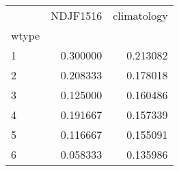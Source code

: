 \begin{tabular}{lrr}
\toprule
{} &  NDJF1516 &  climatology \\
wtype &           &              \\
\midrule
1     &  0.300000 &     0.213082 \\
2     &  0.208333 &     0.178018 \\
3     &  0.125000 &     0.160486 \\
4     &  0.191667 &     0.157339 \\
5     &  0.116667 &     0.155091 \\
6     &  0.058333 &     0.135986 \\
\bottomrule
\end{tabular}
